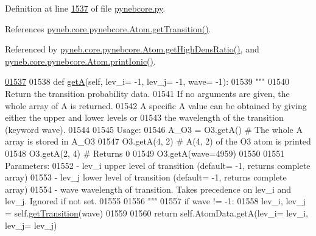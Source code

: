 Definition at line \hyperlink{pynebcore_8py_source_l01537}{1537} of file \hyperlink{pynebcore_8py_source}{pynebcore.\-py}.



References \hyperlink{pynebcore_8py_source_l01472}{pyneb.\-core.\-pynebcore.\-Atom.\-get\-Transition()}.



Referenced by \hyperlink{pynebcore_8py_source_l01719}{pyneb.\-core.\-pynebcore.\-Atom.\-get\-High\-Dens\-Ratio()}, and \hyperlink{pynebcore_8py_source_l02233}{pyneb.\-core.\-pynebcore.\-Atom.\-print\-Ionic()}.


\begin{DoxyCode}
\hypertarget{classpyneb_1_1core_1_1pynebcore_1_1_atom_l01537}{}\hyperlink{classpyneb_1_1core_1_1pynebcore_1_1_atom_a4b3ea50d7c77fdf645c2cea97243c17e}{01537} 
01538     \textcolor{keyword}{def }\hyperlink{classpyneb_1_1core_1_1pynebcore_1_1_atom_a4b3ea50d7c77fdf645c2cea97243c17e}{getA}(self, lev\_i= -1, lev\_j= -1, wave= -1):
01539         \textcolor{stringliteral}{"""}
01540 \textcolor{stringliteral}{        Return the transition probability data. }
01541 \textcolor{stringliteral}{        If no arguments are given, the whole array of A is returned.}
01542 \textcolor{stringliteral}{        A specific A value can be obtained by giving either the upper and lower levels or }
01543 \textcolor{stringliteral}{            the wavelength of the transition (keyword wave).}
01544 \textcolor{stringliteral}{            }
01545 \textcolor{stringliteral}{        Usage:}
01546 \textcolor{stringliteral}{            A\_O3 = O3.getA()          # The whole A array is stored in A\_O3}
01547 \textcolor{stringliteral}{            O3.getA(4, 2)      # A(4, 2) of the O3 atom is printed}
01548 \textcolor{stringliteral}{            O3.getA(2, 4)      # Returns 0}
01549 \textcolor{stringliteral}{            O3.getA(wave=4959)      }
01550 \textcolor{stringliteral}{}
01551 \textcolor{stringliteral}{        Parameters:}
01552 \textcolor{stringliteral}{            - lev\_i  upper level of transition (default= -1, returns complete array)}
01553 \textcolor{stringliteral}{            - lev\_j  lower level of transition (default= -1, returns complete array)}
01554 \textcolor{stringliteral}{            - wave   wavelength of transition. Takes precedence on lev\_i and lev\_j. Ignored if not set.}
01555 \textcolor{stringliteral}{            }
01556 \textcolor{stringliteral}{        """}
01557         \textcolor{keywordflow}{if} wave != -1:
01558             lev\_i, lev\_j = self.\hyperlink{classpyneb_1_1core_1_1pynebcore_1_1_atom_a7c9f17a3d9e841267add92377d9d1ede}{getTransition}(wave)
01559         
01560         \textcolor{keywordflow}{return} self.AtomData.getA(lev\_i= lev\_i, lev\_j= lev\_j)
        
\end{DoxyCode}
